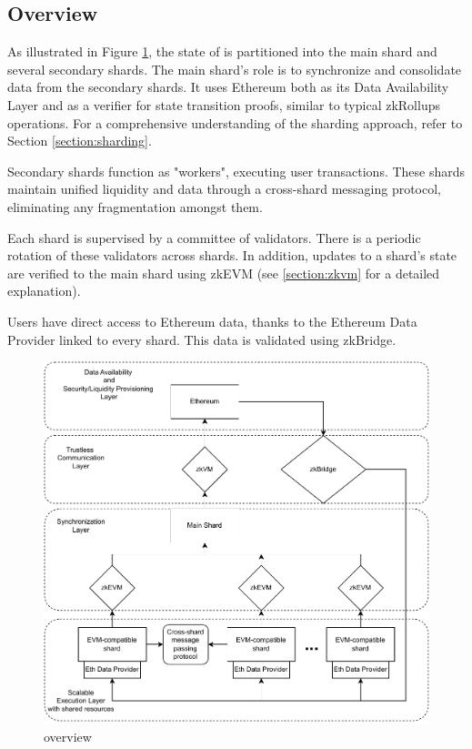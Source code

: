 
\subsection{Overview}

As illustrated in Figure \ref{figure:overview}, 
the state of \protocol is partitioned into the main shard and several secondary 
shards. The main shard's role is to synchronize and consolidate data from the 
secondary shards. It uses Ethereum both as its Data Availability Layer and as a 
verifier for state transition proofs, similar to typical zkRollups operations. 
For a comprehensive understanding of the sharding approach, refer to Section 
\ref{section:sharding}.

Secondary shards function as "workers", executing user transactions. 
These shards maintain unified liquidity and data through a cross-shard messaging 
protocol, eliminating any fragmentation amongst them. 

Each shard is supervised by a committee of validators. There is a periodic 
rotation of these validators across shards. In addition, updates to a shard's 
state are verified to the main shard using zkEVM (see \ref{section:zkvm} for a 
detailed explanation).

Users have direct access to Ethereum data, thanks to the Ethereum Data Provider 
linked to every shard. This data is validated using zkBridge.

\begin{figure}[h]
    \centering
	\includegraphics[scale=0.55]{figures/overview.pdf}
    \caption{\protocol overview}
     \label{figure:overview}
\end{figure}

